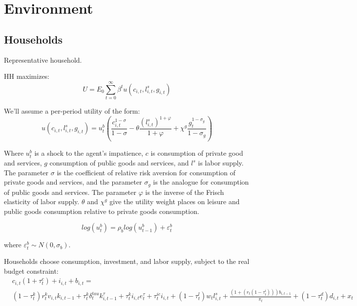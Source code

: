 \documentclass[article,11pt,letterpaper,fleqn]{article}
\theoremstyle{definition}
\numberwithin{equation}{section}
\begin{document}
\section{Environment}
\label{sec:model}

\subsection{Households}
Representative household.

HH maximizes:
\begin{equation}
U=E_{0}\sum_{t=0}^{\infty}\beta^{t}u(c_{i,t},l^{s}_{i,t},g_{i,t})
\end{equation}

We'll assume a per-period utility of the form:
\begin{equation}
u(c_{i,t},l^{s}_{i,t},g_{i,t}) = u^{b}_{t}\left( \frac{c^{1-\sigma}_{i,t}}{1-\sigma}-\theta\frac{(l^{s}_{i,t})^{1+\varphi}}{1+\varphi}+ \chi^{g}\frac{g_{t}^{1-\sigma_{g}}}{1-\sigma_{g}}\right)
\end{equation}

Where $u^{b}_{t}$ is a shock to the agent's impatience, $c$ is consumption of private good and services, $g$ consumption of public goods and services, and $l^{s}$ is labor supply.  The parameter $\sigma$ is the coefficient of relative risk aversion for consumption of private goods and services, and the parameter $\sigma_{g}$ is the analogue for consumption of public goods and services.  The parameter $\varphi$ is the inverse of the Frisch elasticity of labor supply.  $\theta$ and $\chi^{g}$ give the utility weight places on leisure and public goods consumption relative to private goods consumption.  

\begin{equation}
\label{patience_shock}
log(u^{b}_{t}) = \rho_{b}log(u^{b}_{t-1}) + \varepsilon^{b}_{t} 
\end{equation}

where $\varepsilon^{b}_{t} \sim N(0,\sigma_{b})$.

Households choose consumption, investment, and labor supply, subject to the real budget constraint:
\begin{equation}
\label{HH_BC}
\begin{split}
& c_{i,t}(1+\tau^{c}_{t}) + i_{i,t} + b_{i,t}   = \\ 
& (1-\tau^{k}_{t})r^{k}_{t}v_{i,t}k_{i,t-1} + \tau^{k}_{t}\delta^{tau}_{t}k^{\tau}_{i,t-1} +  \tau^{k}_{t}i_{i,t}e^{\tau}_{t} + \tau^{ic}_{t}i_{i,t} + (1-\tau^{l}_{t})w_{t}l^{s}_{i,t} + \frac{(1+(r_{t}(1-\tau^{i}_{t})))b_{i,t-1}}{\pi_{t}} + (1-\tau^{d}_{t})d_{i,t} + x_{t}  
\end{split}
\end{equation}
\end{document}
